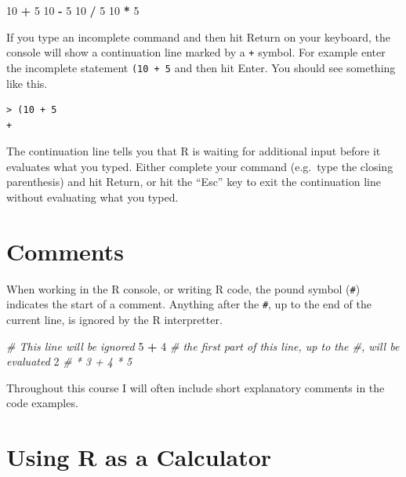 \documentclass[]{book}
\newenvironment{Shaded}{\begin{snugshade}}{\end{snugshade}}
\newcommand{\CommentTok}[1]{\textcolor[rgb]{0.56,0.35,0.01}{\textit{#1}}}
\newcommand{\DecValTok}[1]{\textcolor[rgb]{0.00,0.00,0.81}{#1}}
\newcommand{\OperatorTok}[1]{\textcolor[rgb]{0.81,0.36,0.00}{\textbf{#1}}}
\newcommand{\StringTok}[1]{\textcolor[rgb]{0.31,0.60,0.02}{#1}}
\theoremstyle{definition}
\theoremstyle{definition}
\theoremstyle{definition}
\theoremstyle{remark}
\begin{document}
\begin{Shaded}
\begin{Highlighting}[]
\DecValTok{10} \OperatorTok{+}\StringTok{ }\DecValTok{5}
\DecValTok{10} \OperatorTok{-}\StringTok{ }\DecValTok{5}
\DecValTok{10} \OperatorTok{/}\StringTok{ }\DecValTok{5}
\DecValTok{10} \OperatorTok{*}\StringTok{ }\DecValTok{5}
\end{Highlighting}
\end{Shaded}

If you type an incomplete command and then hit Return on your keyboard,
the console will show a continuation line marked by a \texttt{+} symbol.
For example enter the incomplete statement \texttt{(10\ +\ 5} and then
hit Enter. You should see something like this.

\begin{verbatim}
> (10 + 5
+
\end{verbatim}

The continuation line tells you that R is waiting for additional input
before it evaluates what you typed. Either complete your command
(e.g.~type the closing parenthesis) and hit Return, or hit the ``Esc''
key to exit the continuation line without evaluating what you typed.

\hypertarget{comments}{%
\section{Comments}\label{comments}}

When working in the R console, or writing R code, the pound symbol
(\texttt{\#}) indicates the start of a comment. Anything after the
\texttt{\#}, up to the end of the current line, is ignored by the R
interpretter.

\begin{Shaded}
\begin{Highlighting}[]
\CommentTok{# This line will be ignored}
\DecValTok{5} \OperatorTok{+}\StringTok{ }\DecValTok{4} \CommentTok{# the first part of this line, up to the #, will be evaluated}
\DecValTok{2} \CommentTok{# * 3  + 4 * 5}
\end{Highlighting}
\end{Shaded}

Throughout this course I will often include short explanatory comments
in the code examples.

\hypertarget{using-r-as-a-calculator}{%
\section{Using R as a Calculator}\label{using-r-as-a-calculator}}
\end{document}
